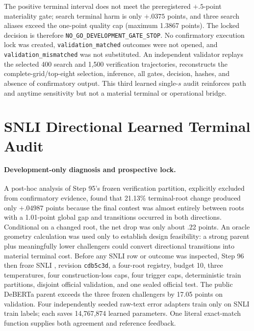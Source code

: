 The positive terminal interval does not meet the preregistered $+.5$-point materiality gate; search terminal harm is only $+.0375$ points, and three search aliases exceed the one-point quality cap (maximum 1.3867 points). The locked decision is therefore \texttt{NO\_GO\_DEVELOPMENT\_GATE\_STOP}. No confirmatory execution lock was created, \texttt{validation\_matched} outcomes were not opened, and \texttt{validation\_mismatched} was not substituted. An independent validator replays the selected 400 search and 1,500 verification trajectories, reconstructs the complete-grid/top-eight selection, inference, all gates, decision, hashes, and absence of confirmatory output. This third learned single-$s$ audit reinforces path and anytime sensitivity but not a material terminal or operational bridge.

\section{SNLI Directional Learned Terminal Audit}
\label{app:step96}

\paragraph{Development-only diagnosis and prospective lock.}
A post-hoc analysis of Step 95's frozen verification partition, explicitly excluded from confirmatory evidence, found that 21.13\% terminal-root change produced only $+.04987$ points because the final contest was almost entirely between roots with a 1.01-point global gap and transitions occurred in both directions. Conditional on a changed root, the net drop was only about .22 points. An oracle geometry calculation was used only to establish design feasibility: a strong parent plus meaningfully lower challengers could convert directional transitions into material terminal cost. Before any SNLI row or outcome was inspected, Step 96 then froze SNLI \citep{bowman2015snli}, revision \texttt{cdb5c3d}, a four-root registry, budget 10, three temperatures, four construction-loss caps, four trigger caps, deterministic train partitions, disjoint official validation, and one sealed official test. The public DeBERTa parent exceeds the three frozen challengers by 17.05 points on validation. Four independently seeded raw-text error adapters train only on SNLI train labels; each saves 14,767,874 learned parameters. One literal exact-match function supplies both agreement and reference feedback.

